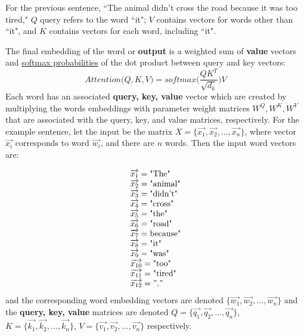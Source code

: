 For the previous sentence, ``The animal didn't cross the road because it was too tired,"  $Q$ query refers to the word ``it"; $V$ contains vectors for words other than ``it", and $K$ contains vectors for each word, including ``it".  

The final embedding of the word or \textbf{output} is a weighted sum of \textbf{value} vectors and \hyperref[cnc:softmaxLayer]{softmax probabilities} of the dot product between query and key vectors: 
$$
Attention \Big(Q, K, V \Big) = softmax \Bigg(\frac {QK^T} {\sqrt{d_k}} \Bigg) V
$$
Each word has an associated \textbf{query, key, value} vector which are created by multiplying the words embeddings with parameter weight matrices $W^Q, W^K, W^V$ that are associated with the query, key, and value matrices, respectively. For the example sentence, let the input be the matrix $X = \{\overrightarrow{x_1}, \overrightarrow{x_2}, ..., \overrightarrow{x_n}\}$, where vector $\overrightarrow{x_i}$ corresponds to word $\overrightarrow{w_i}$, and there are $n$ words. Then the input word vectors are: 

$$
\begin{array}{ll}
\overrightarrow{x_1} = \text{"The"} \\
\overrightarrow{x_2} = \text{"animal"} \\
\overrightarrow{x_3} = \text{"didn't"} \\
\overrightarrow{x_4} = \text{"cross"} \\
\overrightarrow{x_5} = \text{"the"} \\
\overrightarrow{x_6} = \text{"road"} \\
\overrightarrow{x_7} = \text{because"} \\
\overrightarrow{x_8} = \text{"it"} \\
\overrightarrow{x_9} = \text{"was"} \\
\overrightarrow{x_{10}} = \text{"too"} \\
\overrightarrow{x_{11}} = \text{"tired"} \\
\overrightarrow{x_{12}} = "." \\
\end{array}
$$
and the corresponding word embedding vectors are denoted $\Big\{ \overrightarrow{w_1}, \overrightarrow{w_2}, ..., \overrightarrow{w_n} \Big\}$ and the \textbf{query, key, value} matrices are denoted $Q = \Big\{\overrightarrow{q_1}, \overrightarrow{q_2}, ..., \overrightarrow{q_n} \Big\}$, $K = \Big\{\overrightarrow{k_1}, \overrightarrow{k_2}, ..., \overrightarrow{k_n} \Big\}$, $V = \Big\{\overrightarrow{v_1}, \overrightarrow{v_2}, ..., \overrightarrow{v_n} \Big\}$ respectively.


